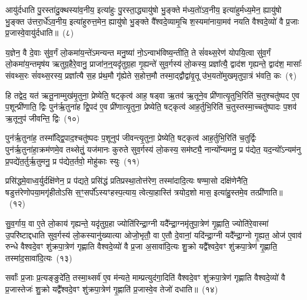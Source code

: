 आयु॑र्दधाति पु॒रस्ता॑दु॒क्थस्या॑व॒नीय॒ इत्या॑हुः पु॒रस्ता॒द्ध्यायु॑षो भु॒ङ्क्ते म॑ध्य॒तो॑\-ऽव॒नीय॒ इत्या॑हुर्मध्य॒मेन॒ ह्यायु॑षो भु॒ङ्क्त उ॑त्तरा॒र्धे॑\-ऽव॒नीय॒ इत्या॑हुरुत्त॒मेन॒ ह्यायु॑षो भु॒ङ्क्ते वै᳚श्वदे॒व्यामृ॒चि श॒स्यमा॑नाया॒मव॑ नयति वैश्वदे॒व्यो॑ वै प्र॒जाः प्र॒जास्वे॒वायु॑र्दधाति॥~(८)

{\anuvakamend[{ध्रु॒वस्तस्मा॑दे॒व य॒ज्ञस्यैका॒न्नच॑त्वारि॒ꣳ॒शच्च॑}]}%

य॒ज्ञेन॒ वै दे॒वाः सु॑व॒र्गं लो॒कमा॑य॒न्ते॑\-ऽमन्यन्त मनु॒ष्या॑ नो॒\-ऽन्वाभ॑विष्य॒न्तीति॒ ते सं॑वथ्स॒रेण॑ योपयि॒त्वा सु॑व॒र्गं लो॒कमा॑य॒न्तमृष॑य ऋतुग्र॒हैरे॒वानु॒ प्राजा॑न॒न्॒यदृ॑तुग्र॒हा गृ॒ह्यन्ते॑ सुव॒र्गस्य॑ लो॒कस्य॒ प्रज्ञा᳚त्यै॒ द्वाद॑श गृह्यन्ते॒ द्वाद॑श॒ मासाः᳚ संवथ्स॒रः सं॑वथ्स॒रस्य॒ प्रज्ञा᳚त्यै स॒ह प्र॑थ॒मौ गृ॑ह्येते स॒होत्त॒मौ तस्मा॒द्द्वौद्वा॑वृ॒तू उ॑भ॒यतो॑मुखमृतुपा॒त्रं भ॑वति॒ कः~(९)

हि तद्वेद॒ यत॑ ऋतू॒नाम्मुख॑मृ॒तुना॒ प्रेष्येति॒ षट्कृत्व॑ आह॒ षड्वा ऋ॒तव॑ ऋ॒तूने॒व प्री॑णात्यृ॒तुभि॒रिति॑ च॒तुश्चतु॑ष्पद ए॒व प॒शून्प्री॑णाति॒ द्विः पुन॑र्\mbox{}ऋ॒तुना॑ह द्वि॒पद॑ ए॒व प्री॑णात्यृ॒तुना॒ प्रेष्येति॒ षट्कृत्व॑ आह॒र्तुभि॒रिति॑ च॒तुस्तस्मा॒च्चतु॑ष्पादः प॒शव॑ ऋ॒तूनुप॑ जीवन्ति॒ द्विः~(१०)

पुन॑र्\mbox{}ऋ॒तुना॑ह॒ तस्मा᳚द्द्वि॒पाद॒श्चतु॑ष्पदः प॒शूनुप॑ जीवन्त्यृ॒तुना॒ प्रेष्येति॒ षट्कृत्व॑ आह॒र्तुभि॒रिति॑ च॒तुर्द्विः पुन॑र्\mbox{}ऋ॒तुना॑हा॒क्रम॑णमे॒व तथ्सेतुं॒ यज॑मानः कुरुते सुव॒र्गस्य॑ लो॒कस्य॒ सम॑ष्ट्यै॒ नान्यो᳚न्यमनु॒ प्र प॑द्येत॒ यद॒न्यो᳚\-ऽन्यम॑नु प्र॒पद्ये॑त॒र्तुर्\mbox{}ऋ॒तुमनु॒ प्र प॑द्येत॒र्तवो॒ मोहु॑काः स्युः~(११)

प्रसि॑द्धमे॒वाध्व॒र्युर्दक्षि॑णेन॒ प्र प॑द्यते॒ प्रसि॑द्धं प्रतिप्रस्था॒तोत्त॑रेण॒ तस्मा॑दादि॒त्यः षण्मा॒सो दक्षि॑णेनैति॒ षडुत्त॑रेणोपया॒मगृ॑हीतो\-ऽसि स॒ꣳ॒सर्पो᳚\-ऽस्यꣳहस्प॒त्याय॒ त्वेत्या॒हास्ति॑ त्रयोद॒शो मास॒ इत्या॑हु॒स्तमे॒व तत्प्री॑णाति॥~(१२)

{\anuvakamend[{को जी॑वन्ति॒ द्विः स्यु॒श्चतु॑स्त्रिꣳशच्च}]}%

सु॒व॒र्गाय॒ वा ए॒ते लो॒काय॑ गृह्यन्ते॒ यदृ॑तुग्र॒हा ज्योति॑रिन्द्रा॒ग्नी यदै᳚न्द्रा॒ग्नमृ॑तुपा॒त्रेण॑ गृ॒ह्णाति॒ ज्योति॑रे॒वास्मा॑ उ॒परि॑ष्टाद्दधाति सुव॒र्गस्य॑ लो॒कस्यानु॑ख्यात्या ओजो॒भृतौ॒ वा ए॒तौ दे॒वानां॒ यदि॑न्द्रा॒ग्नी यदै᳚न्द्रा॒ग्नो गृ॒ह्यत॒ ओज॑ ए॒वाव॑ रुन्धे वैश्वदे॒वꣳ शु॑क्रपा॒त्रेण॑ गृह्णाति वैश्वदे॒व्यो॑ वै प्र॒जा अ॒सावा॑दि॒त्यः शु॒क्रो यद्वै᳚श्वदे॒वꣳ शु॑क्रपा॒त्रेण॑ गृ॒ह्णाति॒ तस्मा॑द॒सावा॑दि॒त्यः~(१३)

सर्वाः᳚ प्र॒जाः प्र॒त्यङ्ङुदे॑ति॒ तस्मा॒थ्सर्व॑ ए॒व म॑न्यते॒ माम्प्रत्युद॑गा॒दिति॑ वैश्वदे॒वꣳ शु॑क्रपा॒त्रेण॑ गृह्णाति वैश्वदे॒व्यो॑ वै प्र॒जास्तेजः॑ शु॒क्रो यद्वै᳚श्वदे॒वꣳ शु॑क्रपा॒त्रेण॑ गृ॒ह्णाति॑ प्र॒जास्वे॒व तेजो॑ दधाति॥~(१४)

